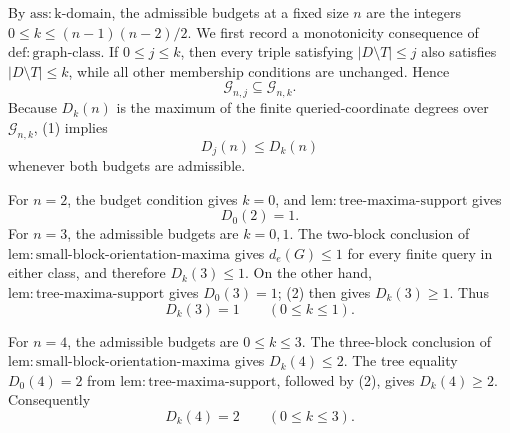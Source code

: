 By \(\mathrm{ass:k\mbox{-}domain}\), the admissible budgets at a fixed size \(n\) are the integers \(0\leq k\leq (n-1)(n-2)/2\).  We first record a monotonicity consequence of \(\mathrm{def:graph\mbox{-}class}\).  If \(0\leq j\leq k\), then every triple satisfying \(|D\setminus T|\leq j\) also satisfies \(|D\setminus T|\leq k\), while all other membership conditions are unchanged.  Hence
\[
 \mathcal G_{n,j}\subseteq\mathcal G_{n,k}.
\tag{1}
\]
Because \(D_k(n)\) is the maximum of the finite queried-coordinate degrees over \(\mathcal G_{n,k}\), (1) implies
\[
 D_j(n)\leq D_k(n)
\tag{2}
\]
whenever both budgets are admissible.

For \(n=2\), the budget condition gives \(k=0\), and \(\mathrm{lem:tree\mbox{-}maxima\mbox{-}support}\) gives
\[
 D_0(2)=1.
\tag{3}
\]
For \(n=3\), the admissible budgets are \(k=0,1\).  The two-block conclusion of \(\mathrm{lem:small\mbox{-}block\mbox{-}orientation\mbox{-}maxima}\) gives \(d_e(G)\leq1\) for every finite query in either class, and therefore \(D_k(3)\leq1\).  On the other hand, \(\mathrm{lem:tree\mbox{-}maxima\mbox{-}support}\) gives \(D_0(3)=1\); (2) then gives \(D_k(3)\geq1\).  Thus
\[
 D_k(3)=1\qquad(0\leq k\leq1).
\tag{4}
\]

For \(n=4\), the admissible budgets are \(0\leq k\leq3\).  The three-block conclusion of \(\mathrm{lem:small\mbox{-}block\mbox{-}orientation\mbox{-}maxima}\) gives \(D_k(4)\leq2\).  The tree equality \(D_0(4)=2\) from \(\mathrm{lem:tree\mbox{-}maxima\mbox{-}support}\), followed by (2), gives \(D_k(4)\geq2\).  Consequently
\[
 D_k(4)=2\qquad(0\leq k\leq3).
\tag{5}
\]

